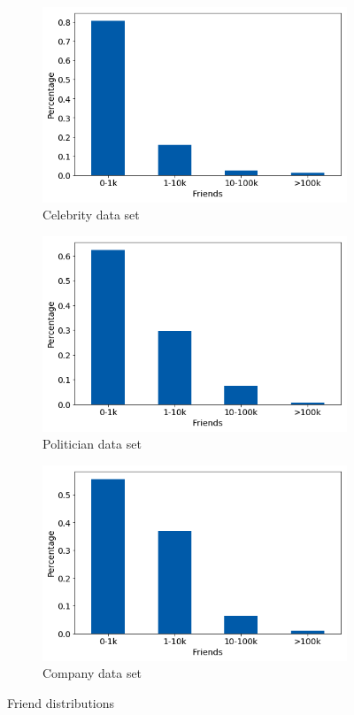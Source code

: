 \begin{figure}[h]
\centering
\begin{subfigure}{.33\textwidth}
  \centering
  \includegraphics[width=.95\linewidth]{img/celeb_friend_distr}
  \caption{Celebrity data set}
  \label{fig:friend_distr_sub1}
\end{subfigure}%
\begin{subfigure}{.33\textwidth}
  \centering
  \includegraphics[width=.95\linewidth]{img/polit_friend_distr}
  \caption{Politician data set}
  \label{fig:friend_distr_sub2}
\end{subfigure}
\begin{subfigure}{.33\textwidth}
  \centering
  \includegraphics[width=.95\linewidth]{img/corp_friend_distr}
  \caption{Company data set}
  \label{fig:friend_distr_sub3}
\end{subfigure}%
\caption{Friend distributions}
\label{fig:friend_distr}
\end{figure}

